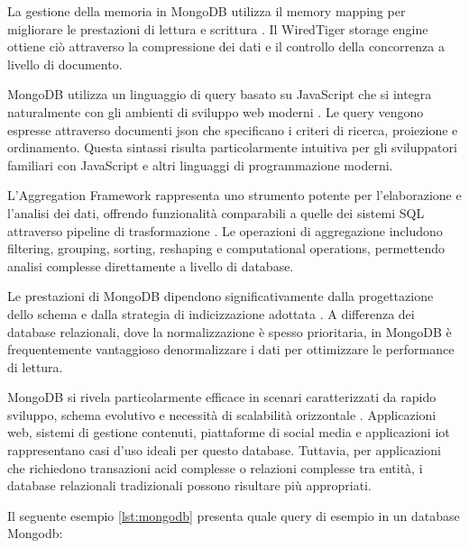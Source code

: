 La gestione della memoria in MongoDB utilizza il memory mapping per migliorare le prestazioni di lettura e scrittura
\cite{dayley2014mongodb}. Il WiredTiger storage engine ottiene ciò attraverso la compressione dei dati e il controllo
della concorrenza a livello di documento.

MongoDB utilizza un linguaggio di query basato su JavaScript che si integra naturalmente con gli ambienti
di sviluppo web moderni \cite{harrison2015mongodb}. Le query vengono espresse attraverso documenti \acrshort{json}
che specificano i criteri di ricerca, proiezione e ordinamento. Questa sintassi risulta particolarmente intuitiva
per gli sviluppatori familiari con JavaScript e altri linguaggi di programmazione moderni.

L'Aggregation Framework rappresenta uno strumento potente per l'elaborazione e l'analisi dei dati,
offrendo funzionalità comparabili a quelle dei sistemi SQL attraverso pipeline di trasformazione
 \cite{membrey2014definitive}. Le operazioni di aggregazione includono filtering, grouping, sorting,
 reshaping e computational operations, permettendo analisi complesse direttamente a livello di database.

Le prestazioni di MongoDB dipendono significativamente dalla progettazione dello schema e dalla strategia
di indicizzazione adottata \cite{chodorow2013mongodb}. A differenza dei database relazionali,
dove la normalizzazione è spesso prioritaria, in MongoDB è frequentemente vantaggioso denormalizzare i dati
per ottimizzare le performance di lettura.

MongoDB si rivela particolarmente efficace in scenari caratterizzati da rapido sviluppo,
schema evolutivo e necessità di scalabilità orizzontale \cite{banker2011mongodb}.
Applicazioni web, sistemi di gestione contenuti, piattaforme di social media e applicazioni \acrshort{iot}
rappresentano casi d'uso ideali per questo database. Tuttavia, per applicazioni che richiedono
transazioni \acrshort{acid} complesse o relazioni complesse tra entità, i database relazionali
tradizionali possono risultare più appropriati.

Il seguente esempio \ref{lst:mongodb} presenta quale query di esempio in un database Mongodb:

